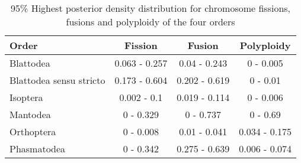 \begin{table}[h]
\centering
\begin{tabular}{lccc}
\hline
\textbf{Order}          & \textbf{Fission} & \textbf{Fusion} & \textbf{Polyploidy} \\ \hline
Blattodea               & 0.063 - 0.257    & 0.04 - 0.243    & 0 - 0.005           \\
Blattodea sensu stricto & 0.173 - 0.604    & 0.202 - 0.619   & 0 - 0.01            \\
Isoptera                & 0.002 - 0.1      & 0.019 - 0.114   & 0 - 0.006           \\
Mantodea                & 0 - 0.329        & 0 - 0.737       & 0 - 0.69            \\
Orthoptera              & 0 - 0.008        & 0.01 - 0.041    & 0.034 - 0.175       \\
Phasmatodea             & 0 - 0.342        & 0.275 - 0.639   & 0.006 - 0.074       \\ \hline
\end{tabular}
\caption{95\% Highest posterior density distribution for chromosome fissions, fusions and polyploidy of the four orders}
\label{tab:HPD}
\end{table}